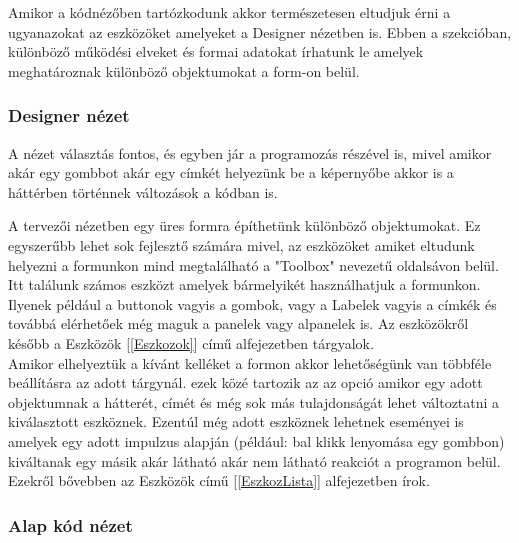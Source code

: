 \documentclass[tocnopagenum]{thesis-ekf}
\theoremstyle{definition}
\theoremstyle{remark}
\begin{document}
	Amikor a kódnézőben tartózkodunk akkor természetesen eltudjuk érni a ugyanazokat az eszközöket amelyeket a Designer nézetben is.
	Ebben a szekcióban, különböző működési elveket és formai adatokat írhatunk le amelyek meghatároznak különböző objektumokat a form-on belül. 
	\subsubsection{Designer nézet}
	A nézet választás fontos, és egyben jár a programozás részével is, mivel amikor akár egy gombbot akár egy címkét helyezünk be a képernyőbe akkor is a háttérben történnek változások a kódban is.
	
	A tervezői nézetben egy üres formra építhetünk különböző objektumokat.
	Ez egyszerűbb lehet sok fejlesztő számára mivel, az eszközöket amiket eltudunk helyezni a formunkon mind megtalálható a "Toolbox" nevezetű oldalsávon belül.
	\\
	Itt találunk számos eszközt amelyek bármelyikét használhatjuk a formunkon. Ilyenek például a buttonok vagyis a gombok, vagy a Labelek vagyis a címkék és továbbá elérhetőek még maguk a panelek vagy alpanelek is. Az eszközökről később a  Eszközök [\ref{Eszkozok}] című alfejezetben tárgyalok.
	\\
	Amikor elhelyeztük a kívánt kelléket a formon akkor lehetőségünk van többféle beállításra az adott tárgynál. ezek közé tartozik az az opció amikor egy adott objektumnak a hátterét, címét és még sok más tulajdonságát lehet változtatni a kiválasztott eszköznek. Ezentúl még adott eszköznek lehetnek eseményei is amelyek egy adott impulzus alapján (például: bal klikk lenyomása egy gombbon) kiváltanak egy másik akár látható akár nem látható reakciót a programon belül. Ezekről bővebben az Eszközök című [\ref{EszkozLista}] alfejezetben írok.
	
	\subsubsection{Alap kód nézet}
	
\end{document}
